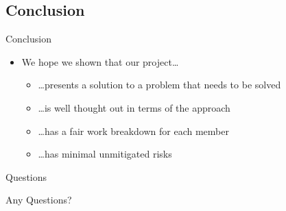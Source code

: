 \documentclass{beamer}
\begin{document}
\subsection{Conclusion}
\begin{frame}{Conclusion}
  \begin{itemize}
  \item We hope we shown that our project\dots
    \begin{itemize}
    \item \dots presents a solution to a problem that needs to be solved
    \item \dots is well thought out in terms of the approach
    \item \dots has a fair work breakdown for each member
    \item \dots has minimal unmitigated risks
    \end{itemize}
  \end{itemize}
\end{frame}


\begin{frame}{Questions}
 \begin{center}
  \item Any Questions?
 \end{center}
\end{frame}
\end{document}
